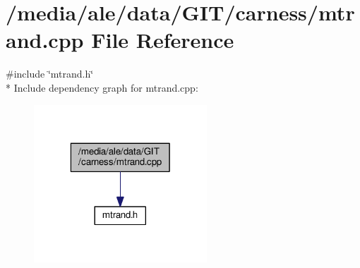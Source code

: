 \hypertarget{a00040}{\section{/media/ale/data/\-G\-I\-T/carness/mtrand.cpp File Reference}
\label{a00040}
}
{\ttfamily \#include \char`\"{}mtrand.\-h\char`\"{}}\\*
Include dependency graph for mtrand.\-cpp\-:\nopagebreak
\begin{figure}[H]
\begin{center}
\leavevmode
\includegraphics[width=184pt]{a00074}
\end{center}
\end{figure}
